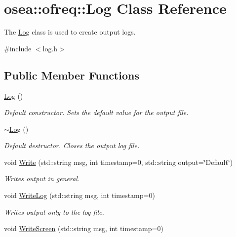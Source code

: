 \hypertarget{classosea_1_1ofreq_1_1_log}{\section{osea\-:\-:ofreq\-:\-:Log Class Reference}
\label{classosea_1_1ofreq_1_1_log}
}


The \hyperlink{classosea_1_1ofreq_1_1_log}{Log} class is used to create output logs.  




{\ttfamily \#include $<$log.\-h$>$}

\subsection*{Public Member Functions}
\begin{DoxyCompactItemize}
\item 
\hyperlink{classosea_1_1ofreq_1_1_log_af6071a60aa52b6c1b511f99b4bc1b8fe}{Log} ()
\begin{DoxyCompactList}\small\item\em Default constructor. Sets the default value for the output file. \end{DoxyCompactList}\item 
\hyperlink{classosea_1_1ofreq_1_1_log_a0fbfda88fbee5027c89f6eb121059360}{$\sim$\-Log} ()
\begin{DoxyCompactList}\small\item\em Default destructor. Closes the output log file. \end{DoxyCompactList}\item 
void \hyperlink{classosea_1_1ofreq_1_1_log_a12976c7499decb341c11e3450e257693}{Write} (std\-::string msg, int timestamp=0, std\-::string output=\char`\"{}Default\char`\"{})
\begin{DoxyCompactList}\small\item\em Writes output in general. \end{DoxyCompactList}\item 
void \hyperlink{classosea_1_1ofreq_1_1_log_ae4776c638b695d57732ff14ce8fdfc3f}{Write\-Log} (std\-::string msg, int timestamp=0)
\begin{DoxyCompactList}\small\item\em Writes output only to the log file. \end{DoxyCompactList}\item 
void \hyperlink{classosea_1_1ofreq_1_1_log_a34662fd2658b0da10aeb031e493b557d}{Write\-Screen} (std\-::string msg, int timestamp=0)

\end{DoxyCompactItemize}
